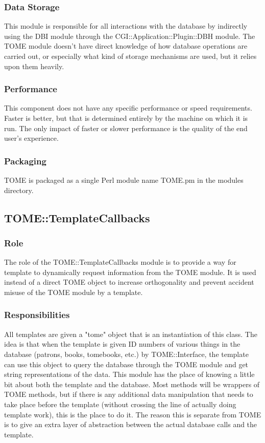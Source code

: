 \documentclass[12pt,titlepage]{article}
\begin{document}
\subsubsection{Data Storage}
This module is responsible for all interactions with the database by indirectly using the DBI module through the CGI::Application::Plugin::DBH module.  The TOME module doesn't have direct knowledge of how database operations are carried out, or especially what kind of storage mechanisms are used, but it relies upon them heavily.
\subsubsection{Performance}
This component does not have any specific performance or speed requirements.  Faster is better, but that is determined entirely by the machine on which it is run.  The only impact of faster or slower performance is the quality of the end user's experience.
\subsubsection{Packaging}
TOME is packaged as a single Perl module name TOME.pm in the modules directory.


\subsection{TOME::TemplateCallbacks}
\subsubsection{Role}
The role of the TOME::TemplateCallbacks module is to provide a way for template to dynamically request information from the TOME module.  It is used instead of a direct TOME object to increase orthogonality and prevent accident misuse of the TOME module by a template.
\subsubsection{Responsibilities}
All templates are given a "tome" object that is an instantiation of this class. The idea is that when the template is given ID numbers of various things in the database (patrons, books, tomebooks, etc.) by TOME::Interface, the template can use this object to query the database through the TOME module and get string representations of the data. This module has the place of knowing a little bit about both the template and the database. Most methods will be wrappers of TOME methods, but if there is any additional data manipulation that needs to take place before the template (without crossing the line of actually doing template work), this is the place to do it. The reason this is separate from TOME is to give an extra layer of abstraction between the actual database calls and the template.
\end{document}
